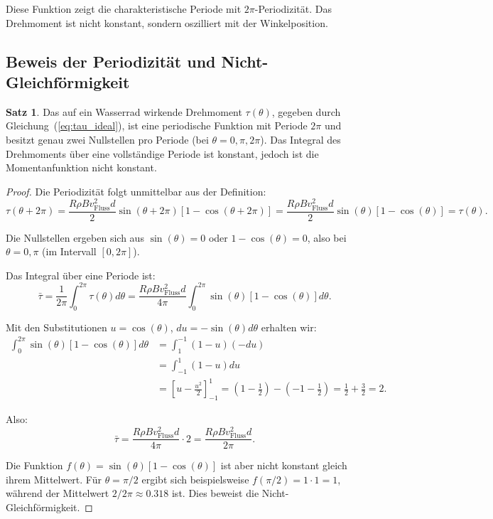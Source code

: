 \documentclass[a4paper,12pt]{article}
\theoremstyle{definition}
\newtheorem{satz}{Satz}
\begin{document}
Diese Funktion zeigt die charakteristische Periode mit $2\pi$-Periodizität. Das Drehmoment ist nicht konstant, sondern oszilliert mit der Winkelposition.

\subsection{Beweis der Periodizität und Nicht-Gleichförmigkeit}

\begin{satz}
Das auf ein Wasserrad wirkende Drehmoment $\tau(\theta)$, gegeben durch Gleichung~(\ref{eq:tau_ideal}), ist eine periodische Funktion mit Periode $2\pi$ und besitzt genau zwei Nullstellen pro Periode (bei $\theta = 0, \pi, 2\pi$). Das Integral des Drehmoments über eine vollständige Periode ist konstant, jedoch ist die Momentanfunktion nicht konstant.
\end{satz}

\begin{proof}
Die Periodizität folgt unmittelbar aus der Definition: 
\[
\tau(\theta + 2\pi) = \frac{R \rho B v_\text{Fluss}^2 d}{2} \sin(\theta + 2\pi)[1 - \cos(\theta + 2\pi)]
= \frac{R \rho B v_\text{Fluss}^2 d}{2} \sin(\theta)[1 - \cos(\theta)] = \tau(\theta).
\]

Die Nullstellen ergeben sich aus $\sin(\theta) = 0$ oder $1 - \cos(\theta) = 0$, also bei $\theta = 0, \pi$ (im Intervall $[0, 2\pi]$).

Das Integral über eine Periode ist:
\[
\bar{\tau} = \frac{1}{2\pi} \int_0^{2\pi} \tau(\theta) d\theta = \frac{R \rho B v_\text{Fluss}^2 d}{4\pi} \int_0^{2\pi} \sin(\theta)[1 - \cos(\theta)] d\theta.
\]

Mit den Substitutionen $u = \cos(\theta)$, $du = -\sin(\theta) d\theta$ erhalten wir:
\begin{align}
\int_0^{2\pi} \sin(\theta)[1 - \cos(\theta)] d\theta &= \int_1^{-1} (1-u) (-du) \\ &= \int_{-1}^{1} (1-u) du \\ &= \left[u - \frac{u^2}{2}\right]_{-1}^{1}
= \left(1 - \frac{1}{2}\right) - \left(-1 - \frac{1}{2}\right) = \frac{1}{2} + \frac{3}{2} = 2.
\end{align}

Also:
\[
\bar{\tau} = \frac{R \rho B v_\text{Fluss}^2 d}{4\pi} \cdot 2 = \frac{R \rho B v_\text{Fluss}^2 d}{2\pi}.
\]

Die Funktion $f(\theta) = \sin(\theta)[1-\cos(\theta)]$ ist aber nicht konstant gleich ihrem Mittelwert. Für $\theta = \pi/2$ ergibt sich beispielsweise $f(\pi/2) = 1 \cdot 1 = 1$, während der Mittelwert $2/2\pi \approx 0.318$ ist. Dies beweist die Nicht-Gleichförmigkeit.
\end{proof}
\end{document}
